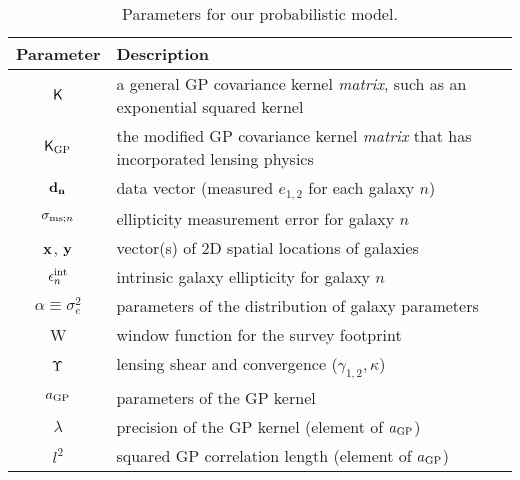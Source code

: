 \begin{table}%
\begin{center}
\caption{Parameters for our probabilistic model.}
\label{tab:sampling_parameters}
\begin{tabular}{cl}
\hline
Parameter & Description \\
\hline
$\mathsf{K}$ & a general GP covariance kernel {\it matrix}, such as an exponential squared kernel \\
$\mathsf{K}_{\rm GP}$  & the modified GP covariance kernel {\it matrix} that has incorporated
lensing physics\\
${\bf d_{n}}$ & data vector (measured $e_{1,2}$ for each galaxy $n$)  \\
$\sigma_{{\rm ms}; n}$ & ellipticity measurement error for galaxy $n$ 
\\
$\mathbf{x}$, $\mathbf{y}$ & vector(s) of 2D spatial locations of galaxies \\
$\epsilon_n^{\rm int}$ & intrinsic galaxy ellipticity for galaxy $n$ \\
$\alpha\equiv\sigma_{e}^2$ & parameters of the distribution of galaxy parameters \\
W & window function for the survey footprint \\
$\Upsilon$ & lensing shear and convergence ($\gamma_{1,2}, \kappa$) \\
$a_{\rm GP}$ & parameters of the GP kernel\\
$\lambda$ & precision of the GP kernel (element of $a_{\rm GP}$) \\
$l^2$ & squared GP correlation length (element of $a_{\rm GP}$) \\
\hline
\end{tabular}
\end{center}
\end{table}


